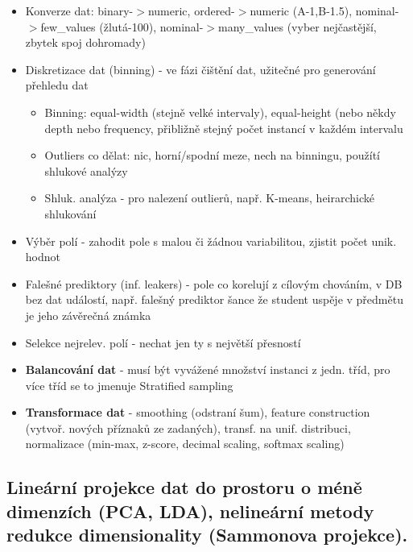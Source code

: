 \documentclass[a4paper,hidelinks]{article}
\begin{document}
\begin{itemize}
    \item Konverze dat: binary-$>$numeric, ordered-$>$numeric (A-1,B-1.5), nominal-$>$few\_values (žlutá-100), nominal-$>$many\_values (vyber nejčastější, zbytek spoj dohromady)
    \item Diskretizace dat (binning) - ve fázi čištění dat, užitečné pro generování přehledu dat
        \begin{itemize}
            \item Binning: equal-width (stejně velké intervaly), equal-height (nebo někdy depth nebo frequency, přibližně stejný počet instancí v každém intervalu
            \item Outliers co dělat: nic, horní/spodní meze, nech na binningu, použítí shlukové analýzy
            \item Shluk. analýza - pro nalezení outlierů, např. K-means, heirarchické shlukování
        \end{itemize}
    \item Výběr polí - zahodit pole s malou či žádnou variabilitou, zjistit počet unik. hodnot
    \item Falešné prediktory (inf. leakers) - pole co korelují z cílovým chováním, v DB bez dat událostí, např. falešný prediktor šance že student uspěje v předmětu je jeho závěrečná známka
    \item Selekce nejrelev. polí - nechat jen ty s největší přesností
    \item \textbf{Balancování dat} - musí být vyvážené množství instanci z jedn. tříd, pro více tříd se to jmenuje Stratified sampling
    \item \textbf{Transformace dat} - smoothing (odstraní šum), feature construction (vytvoř. nových příznaků ze zadaných), transf. na unif. distribuci, normalizace (min-max, z-score, decimal scaling, softmax scaling)
\end{itemize}


\subsection{Lineární projekce dat do prostoru o méně dimenzích (PCA, LDA), nelineární metody redukce dimensionality (Sammonova projekce).}
\end{document}
